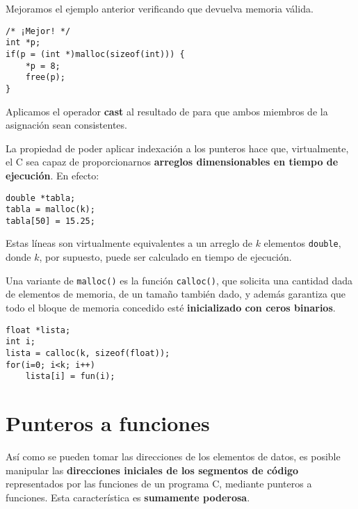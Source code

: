 
\begin{ejemplo}
Mejoramos el ejemplo anterior verificando que  devuelva memoria válida. 

\begin{lstlisting}
/* ¡Mejor! */
int *p;
if(p = (int *)malloc(sizeof(int))) {
	*p = 8;
	free(p);
}
\end{lstlisting}

Aplicamos el operador \textbf{cast} al resultado de  para que ambos miembros de la asignación sean consistentes.
\end{ejemplo}


\begin{ejemplo}
La propiedad de poder aplicar indexación a los punteros hace que, virtualmente,
el C sea capaz de proporcionarnos \textbf{arreglos dimensionables en tiempo de
ejecución}. En efecto:

\begin{lstlisting}
double *tabla;
tabla = malloc(k);
tabla[50] = 15.25;
\end{lstlisting}

Estas líneas son virtualmente equivalentes a un arreglo de $k$ elementos \lstinline{double},
donde $k$, por supuesto, puede ser calculado en tiempo de ejecución.

Una variante de \lstinline{malloc()} es la función \lstinline{calloc()}, que solicita una cantidad dada de
elementos de memoria, de un tamaño también dado, y además garantiza que todo el
bloque de memoria concedido esté \textbf{inicializado con ceros binarios}.

\begin{lstlisting}
float *lista;
int i;
lista = calloc(k, sizeof(float));
for(i=0; i<k; i++)
    lista[i] = fun(i);
\end{lstlisting}
\end{ejemplo}



\section{Punteros a funciones}
Así como se pueden tomar las direcciones de los elementos de datos, es posible
manipular las \textbf{direcciones iniciales de los segmentos de código} representados
por las funciones de un programa C, mediante punteros a funciones. Esta
característica es \textbf{sumamente poderosa}.

